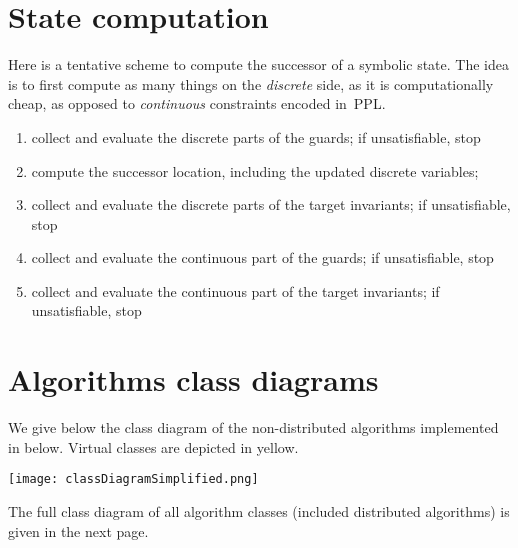 


\chapter{State computation}


Here is a tentative scheme to compute the successor of a symbolic state.
The idea is to first compute as many things on the \emph{discrete} side, as it is computationally cheap, as opposed to \emph{continuous} constraints encoded in~PPL.

\begin{enumerate}
	\item collect and evaluate the discrete parts of the guards; if unsatisfiable, stop
	\item compute the successor location, including the updated discrete variables;
	\item collect and evaluate the discrete parts of the target invariants; if unsatisfiable, stop
	\item collect and evaluate the continuous part of the guards; if unsatisfiable, stop
	\item collect and evaluate the continuous part of the target invariants; if unsatisfiable, stop
\end{enumerate}




\chapter{Algorithms class diagrams}

We give below the class diagram of the non-distributed algorithms implemented in \imitator{} below.
Virtual classes are depicted in yellow.


\texttt{[image: classDiagramSimplified.png]}



The full class diagram of all algorithm classes (included distributed algorithms) is given in the next page.

